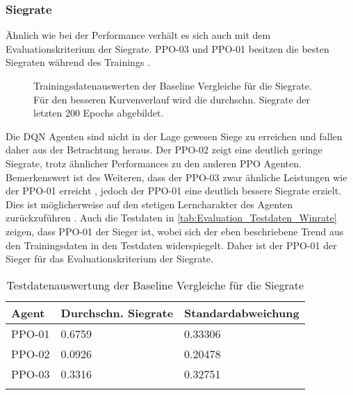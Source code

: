 \subsubsection{Siegrate} \label{subsubsec:Evaluation_Siegrate}
Ähnlich wie bei der Performance verhält es sich auch mit dem Evaluationskriterium der Siegrate. PPO-03 und PPO-01 besitzen die besten Siegraten während des Trainings .
\begin{figure}[H]
	\centering
	
	\caption[Siegrate- Auswertung der Trainingsdaten der Baseline Vergleiche]{Trainingsdatenauswerten der Baseline Vergleiche für die Siegrate. Für den besseren Kurvenverlauf wird die durchschn. Siegrate der letzten 200 Epochs abgebildet.}
	\label{fig:Evaluation_Baseline_winrate}
\end{figure}
Die DQN Agenten sind nicht in der Lage gewesen Siege zu erreichen und fallen daher aus der Betrachtung heraus.
Der PPO-02 zeigt eine deutlich geringe Siegrate, trotz ähnlicher Performances zu den anderen PPO Agenten.
Bemerkenswert ist des Weiteren, dass der PPO-03 zwar ähnliche Leistungen wie der PPO-01 erreicht \linebreak[4] , jedoch der PPO-01 eine deutlich bessere Siegrate erzielt. Dies ist möglicherweise auf den stetigen Lerncharakter des Agenten zurückzuführen .
Auch die Testdaten in \autoref{tab:Evaluation_Testdaten_Winrate} zeigen, dass PPO-01 der Sieger ist, wobei sich der eben beschriebene Trend aus den Trainingsdaten in den Testdaten widerspiegelt. Daher ist der PPO-01 der Sieger für das Evaluationskriterium der Siegrate.
\begin{longtable}[H]{|p{4.5cm}|p{4.5cm}|p{4.5cm}|}
	\hline
	Agent & Durchschn. Siegrate & Standardabweichung \\
	\hline
	PPO-01 & 0.6759 & 0.33306 \\
	\hline
	PPO-02 & 0.0926 & 0.20478 \\
	\hline
	PPO-03 & 0.3316 & 0.32751 \\
	\hline
	\caption{Testdatenauswertung der Baseline Vergleiche für die Siegrate}
	\label{tab:Evaluation_Testdaten_Winrate} 
\end{longtable}

